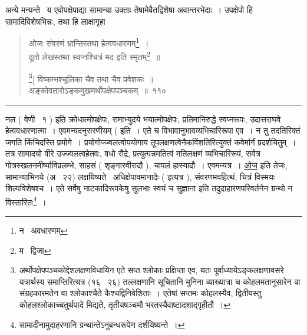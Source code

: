 \documentclass[11pt, openany]{book}
\begin{document}
अन्ये मन्यन्ते \textendash\ य एवोपक्षेपाद्या सामान्या उक्ताः तेषामेवैतद्विशेषा अवान्तरभेदाः~। उपक्षेपो हि सामादिविशेषभिन्नः, तथा हि {\qt लाक्षागृहा \textendash }

\newpage

\begin{quote}
{\na ओजः संवरणं भ्रान्तिस्तथा हेत्ववधारणम्\renewcommand{\thefootnote}{1}\footnote{न \textendash\ अवधारणम्}~।\\
दूतो लेखस्तथा स्वप्नश्चित्रं मद इति स्मृतम्\renewcommand{\thefootnote}{2}\footnote{म \textendash\ द्विजा}~॥

\renewcommand{\thefootnote}{$\ddagger$}\footnote{अर्थोपक्षेपपञ्चकोद्देशलक्षणविधायिन एते सप्त श्लोकाः प्रक्षिप्ता एव, यतः पूर्वाध्यायेऽङ्कलक्षणावसरे यत्रार्थस्य समाप्तिरित्यत्र (१६ \textendash\ २६) तल्लक्षणानि सूचितानि मुनिना व्याख्यात्रा च कोहलमतानुसारेन वा संग्रहकारमतेन वा श्लोकाश्चैते कैश्चद्विनिवेशिताः~। एतेषां सप्तमः कोहलस्यैव, द्वितीयस्तु कोहलश्लोकाच्चतुर्थपादे मिद्यते, तृतीयषञ्चमौ भरतस्यैवाष्टादशाद्गृहीतौ~।}[ विष्कम्भश्चूलिका चैव तथा चैव प्रवेशकः~।\\
अङ्कोवतारोऽङ्कमुखमर्थोपक्षेपपञ्चकम्~॥~११०}
\end{quote}

\hrule

\vspace{2mm}
\noindent
{\qt नल} ( वेणी \textendash\ १ ) इति क्रोधात्मोपक्षेपः, रामाभ्युदये भयात्मोपक्षेपः, प्रतिमानिरुद्धे स्वप्नरूपः, उदात्तराघवे हेत्ववधारणात्मा~। एवमन्यदनुसरणीयम् ( इति~। एते च विभावानुभावव्यभिचारिरूपा एव~। न तु तदतिरिक्तं जगति किंचिदस्ति प्रयोगे~। प्रयोगोज्ज्वलत्वोपयोगाय तूपलक्षणत्वेनैकविंशतिरित्युक्तं कवेर्मार्गं प्रदर्शयितुम्~।\\

तत्र सामादयो वीरे उज्ज्वलत्वहेतवः, वधो रौद्रे, प्रत्युत्पन्नमतित्वं मतिलक्षणं व्यभिचारिरूपं, सर्वत्र गोत्रस्खलनमीर्ष्याविप्रलम्भे, साहसं ( शृङ्गारवीरादौ ), चापलं हास्यादौ~। एवमन्यत्र~। \underline{ओज} इति तेजः, सामान्याभिनये (अ \textendash\ २२) लक्षयिष्यते \textendash\ {\qt अधिक्षेपावमानादेः} ( इत्यत्र ), संवरणमवहित्थं, चित्रं विस्मयः शिल्पविशेषश्च~। एते सर्वेषु नाटकादिरूपकेषु सुलभाः स्वयं च सुज्ञाना इति तदुदाहारणपरिवर्तनेन ग्रन्थो न विस्तारितः\renewcommand{\thefootnote}{*}\footnote{सामादीनामुदाहरणानि ग्रन्थान्तेऽनुबन्धरूपेण दर्शयिष्यन्ते~।}~।

\newpage
\end{document}
